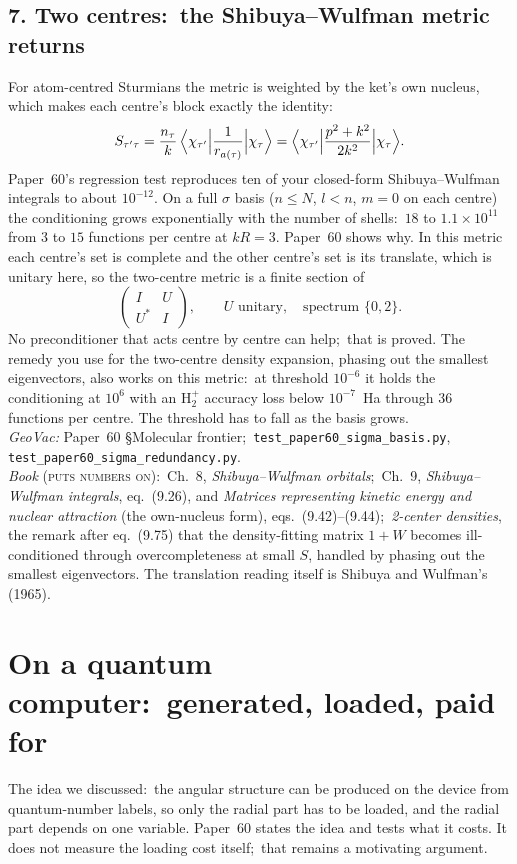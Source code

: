 \documentclass[11pt]{article}
\newcommand{\tst}[1]{\nolinkurl{#1}}
\newcommand{\rel}[1]{\textsc{#1}}
\newcommand{\bk}[1]{\textit{#1}}
\begin{document}
\subsection*{7. Two centres:\ the Shibuya--Wulfman metric returns}
For atom-centred Sturmians the metric is weighted by the ket's own nucleus,
which makes each centre's block exactly the identity:
\[
S_{\tau'\tau} = \frac{n_\tau}{k}\,\Bigl\langle \chi_{\tau'}\Bigr|\frac{1}{r_{a(\tau)}}\Bigl|\chi_\tau\Bigr\rangle
= \Bigl\langle \chi_{\tau'}\Bigr|\frac{p^2+k^2}{2k^2}\Bigl|\chi_\tau\Bigr\rangle .
\]
Paper~60's regression test reproduces ten of your closed-form
Shibuya--Wulfman integrals to about $10^{-12}$. On a full $\sigma$ basis
($n\le N$, $l<n$, $m=0$ on each centre) the conditioning grows exponentially
with the number of shells:\ $18$ to $1.1\times10^{11}$ from $3$ to $15$
functions per centre at $kR=3$. Paper~60 shows why. In this metric each
centre's set is complete and the other centre's set is its translate, which
is unitary here, so the two-centre metric is a finite section of
\[
\begin{pmatrix} I & U\\ U^* & I\end{pmatrix},\qquad U \text{ unitary},\quad
\text{spectrum } \{0,2\}.
\]
No preconditioner that acts centre by centre can help;\ that is proved. The
remedy you use for the two-centre density expansion, phasing out the
smallest eigenvectors, also works on this metric:\ at threshold $10^{-6}$ it
holds the conditioning at $10^{6}$ with an $\mathrm{H}_2^+$ accuracy loss
below $10^{-7}$~Ha through $36$ functions per centre. The threshold has to
fall as the basis grows.\\
\emph{GeoVac:} Paper~60 \S Molecular frontier;\
\tst{test_paper60_sigma_basis.py}, \tst{test_paper60_sigma_redundancy.py}.\\
\emph{Book} (\rel{puts numbers on}):\ Ch.~8, \bk{Shibuya--Wulfman
orbitals};\ Ch.~9, \bk{Shibuya--Wulfman integrals}, eq.~(9.26), and
\bk{Matrices representing kinetic energy and nuclear attraction} (the
own-nucleus form), eqs.~(9.42)--(9.44);\ \bk{2-center densities}, the remark
after eq.~(9.75) that the density-fitting matrix $1+W$ becomes
ill-conditioned through overcompleteness at small $S$, handled by phasing
out the smallest eigenvectors. The translation reading itself is Shibuya
and Wulfman's (1965).

\section{On a quantum computer:\ generated, loaded, paid for}
The idea we discussed:\ the angular structure can be produced on the device
from quantum-number labels, so only the radial part has to be loaded, and
the radial part depends on one variable. Paper~60 states the idea and tests
what it costs. It does not measure the loading cost itself;\ that remains a
motivating argument.
\end{document}

